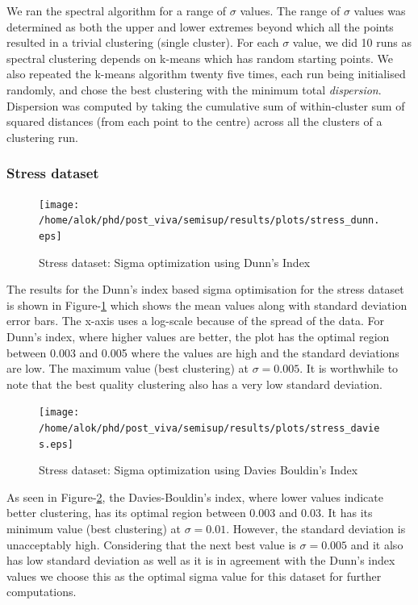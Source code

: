 We ran the spectral algorithm for a range of $\sigma$ values. The range of $\sigma$ values was determined as both the upper and lower extremes beyond which all the points resulted in a trivial clustering (single cluster).  For each $\sigma$ value, we did 10 runs as spectral clustering depends on k-means which has random starting points. We also repeated the k-means algorithm twenty five times, each run being initialised randomly, and chose the best clustering with the minimum total \textit{dispersion}. Dispersion was computed by taking the cumulative sum of within-cluster sum of squared distances (from each point to the centre) across all the clusters of a clustering run.  


\subsubsection{Stress dataset}

\begin{figure}[tp]
 \centering
 \texttt{[image: /home/alok/phd/post\_viva/semisup/results/plots/stress\_dunn.eps]}
 \caption{Stress dataset: Sigma optimization using Dunn's Index}
 \label{fig:stress_sigma_opt_dunn}
\end{figure}

The results for the Dunn's index based sigma optimisation for the stress dataset is shown in Figure-\ref{fig:stress_sigma_opt_dunn} which shows the mean values along with standard deviation error bars. 
The x-axis uses a log-scale because of the spread of the data.  For Dunn's index, where higher values are better, the plot has the optimal region between 0.003 and 0.005 where the values are high and the standard deviations are low.
The maximum value (best clustering) at $\sigma=0.005$. It is worthwhile to note that the best quality clustering also has a very low standard deviation.

\begin{figure}[tp]
 \centering
 \texttt{[image: /home/alok/phd/post\_viva/semisup/results/plots/stress\_davies.eps]}
 \caption{Stress dataset: Sigma optimization using Davies Bouldin's Index}
 \label{fig:stress_sigma_opt_dav}
\end{figure}

As seen in Figure-\ref{fig:stress_sigma_opt_dav}, the Davies-Bouldin's index, where lower values indicate better clustering, has its optimal region between 0.003 and 0.03. It has its minimum value (best clustering) at $\sigma=0.01$. However, the standard deviation is unacceptably high.
Considering that the next best value is $\sigma=0.005$ and it also has low standard deviation as well as it is in agreement with the Dunn's index values we choose this as the optimal sigma value for this dataset for further computations.  

